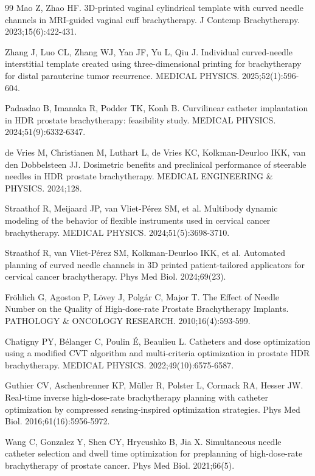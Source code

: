 \documentclass[12pt,twoside,letterpaper]{article}
\newcounter{algorithm}
\begin{document}
\begin{thebibliography}{99}
 Mao Z, Zhao HF. 3D-printed vaginal cylindrical template with curved needle channels in MRI-guided vaginal cuff brachytherapy. J Contemp Brachytherapy. 2023;15(6):422-431.

 Zhang J, Luo CL, Zhang WJ, Yan JF, Yu L, Qiu J. Individual curved-needle interstitial template created using three-dimensional printing for brachytherapy for distal parauterine tumor recurrence. MEDICAL PHYSICS. 2025;52(1):596-604.

 Padasdao B, Imanaka R, Podder TK, Konh B. Curvilinear catheter implantation in HDR prostate brachytherapy: feasibility study. MEDICAL PHYSICS. 2024;51(9):6332-6347.

 de Vries M, Christianen M, Luthart L, de Vries KC, Kolkman-Deurloo IKK, van den Dobbelsteen JJ. Dosimetric benefits and preclinical performance of steerable needles in HDR prostate brachytherapy. MEDICAL ENGINEERING \& PHYSICS. 2024;128.

 Straathof R, Meijaard JP, van Vliet-Pérez SM, et al. Multibody dynamic modeling of the behavior of flexible instruments used in cervical cancer brachytherapy. MEDICAL PHYSICS. 2024;51(5):3698-3710.

 Straathof R, van Vliet-Pérez SM, Kolkman-Deurloo IKK, et al. Automated planning of curved needle channels in 3D printed patient-tailored applicators for cervical cancer brachytherapy. Phys Med Biol. 2024;69(23).

 Fröhlich G, Agoston P, Lövey J, Polgár C, Major T. The Effect of Needle Number on the Quality of High-dose-rate Prostate Brachytherapy Implants. PATHOLOGY \& ONCOLOGY RESEARCH. 2010;16(4):593-599.

 Chatigny PY, Bélanger C, Poulin É, Beaulieu L. Catheters and dose optimization using a modified CVT algorithm and multi-criteria optimization in prostate HDR brachytherapy. MEDICAL PHYSICS. 2022;49(10):6575-6587.

 Guthier CV, Aschenbrenner KP, Müller R, Polster L, Cormack RA, Hesser JW. Real-time inverse high-dose-rate brachytherapy planning with catheter optimization by compressed sensing-inspired optimization strategies. Phys Med Biol. 2016;61(16):5956-5972.

 Wang C, Gonzalez Y, Shen CY, Hrycushko B, Jia X. Simultaneous needle catheter selection and dwell time optimization for preplanning of high-dose-rate brachytherapy of prostate cancer. Phys Med Biol. 2021;66(5).


\end{thebibliography}
\end{document}
